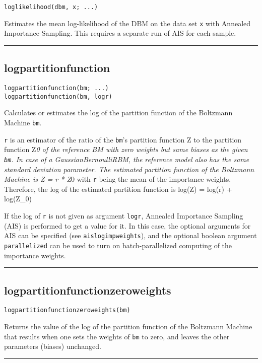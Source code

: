 \begin{verbatim}
loglikelihood(dbm, x; ...)
\end{verbatim}
Estimates the mean log-likelihood of the DBM on the data set \texttt{x} with Annealed Importance Sampling. This requires a separate run of AIS for each sample.

\noindent\rule{\textwidth}{1pt}
\subsection*{logpartitionfunction}
\begin{verbatim}
logpartitionfunction(bm; ...)
logpartitionfunction(bm, logr)
\end{verbatim}
Calculates or estimates the log of the partition function of the Boltzmann Machine \texttt{bm}.

\texttt{r} is an estimator of the ratio of the \texttt{bm}'s partition function Z to the partition function Z\emph{0 of the reference BM with zero weights but same biases as the given \texttt{bm}. In case of a GaussianBernoulliRBM, the reference model also has the same standard deviation parameter. The estimated partition function of the Boltzmann Machine is Z = r * Z}0 with \texttt{r} being the mean of the importance weights. Therefore, the log of the estimated partition function is log(Z) = log(r) + log(Z\_0)

If the log of \texttt{r} is not given as argument \texttt{logr}, Annealed Importance Sampling (AIS) is performed to get a value for it. In this case, the optional arguments for AIS can be specified (see \texttt{aislogimpweights}), and the optional boolean argument \texttt{parallelized} can be used to turn on batch-parallelized computing of the importance weights.

\noindent\rule{\textwidth}{1pt}
\subsection*{logpartitionfunctionzeroweights}
\begin{verbatim}
logpartitionfunctionzeroweights(bm)
\end{verbatim}
Returns the value of the log of the partition function of the Boltzmann Machine that results when one sets the weights of \texttt{bm} to zero, and leaves the other parameters (biases) unchanged.

\noindent\rule{\textwidth}{1pt}
